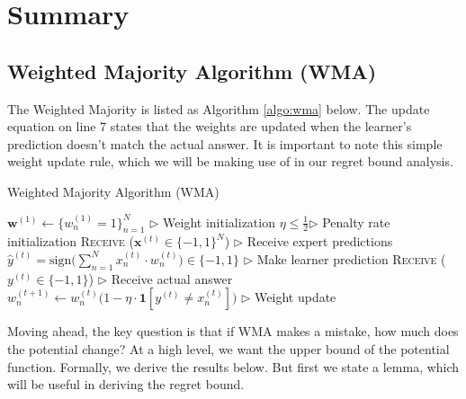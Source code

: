 \documentclass[11pt]{article}
\begin{document}

\section{Summary}
\subsection{Weighted Majority Algorithm (WMA)}
\normalfont
The Weighted Majority \cite{littlestone1989weighted} is listed as Algorithm \ref{algo:wma} below. The update equation on line 7 states that the weights are updated when the learner's prediction doesn't match the actual answer. It is important to note this simple weight update rule, which we will be making use of in our regret bound analysis.

\begin{algorithm}[H]
\caption{Weighted Majority Algorithm (WMA)}
\label{algo:wma}
\begin{algorithmic}[1]
\STATE $\textbf{w}^{(1)} \leftarrow \{w_n^{(1)}=1\}_{n=1}^N$ \hfill $\triangleright$ Weight initialization
\STATE $\eta\leq\frac{1}{2}$\hfill $\triangleright$ Penalty rate initialization
\STATE \textsc{Receive} ($\textbf{x}^{(t)}\in\{-1, 1\}^N$) \hfill $\triangleright$ Receive expert predictions
\STATE $\hat{y}^{(t)} = \text{sign}\Big(\sum_{n=1}^Nx_n^{(t)}\cdot w_n^{(t)}\Big)\in\{-1, 1\}$ \hfill $\triangleright$ Make learner prediction
\STATE \textsc{Receive} ($y^{(t)}\in\{-1, 1\}$) \hfill $\triangleright$ Receive actual answer
\STATE $w_n^{(t+1)}\leftarrow w_n^{(t)}\big(1-\eta\cdot\textbf{1}[y^{(t)}\neq x_n^{(t)}]\big)$ \hfill $\triangleright$ Weight update
\ENDFOR
\end{algorithmic}
\end{algorithm}


Moving ahead, the key question is that if WMA makes a mistake, how much does the potential change? At a high level, we want the upper bound of the potential function. Formally, we derive the results below. But first we state a lemma, which will be useful in deriving the regret bound.

\label{lemma:1}
\end{document}
